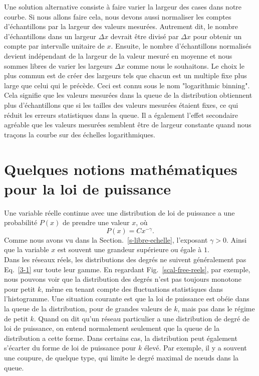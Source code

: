 Une solution alternative consiste à faire varier la largeur des cases dans notre courbe. Si nous allons faire cela, nous devons aussi normaliser les comptes d'échantillons par la largeur des valeurs mesurées. Autrement dit, le nombre d'échantillons dans un largeur $\Delta x$ devrait être divisé par $\Delta x$ pour obtenir un compte par intervalle unitaire de $x$. Ensuite, le nombre d'échantillons normalisés devient indépendant de la largeur de la valeur mesuré en moyenne et nous sommes libres de varier les largeurs $\Delta x$ comme nous le souhaitons. Le choix le plus commun est de créer des largeurs tels que chacun est un multiple fixe plus large que celui qui le précède. Ceci est connu sous le nom "logarithmic binning". Cela signifie que les valeurs mesurées dans la queue de la distribution obtiennent plus d'échantillons que si les tailles des valeurs mesurées étaient fixes, ce qui réduit les erreurs statistiques dans la queue. Il a également l'effet secondaire agréable que les valeurs mesurées semblent être de largeur constante quand nous traçons la courbe sur des échelles logarithmiques.
\section{Quelques notions mathématiques pour la loi de puissance}
Une variable réelle continue avec une distribution de loi de puissance a une probabilité $P(x)$ de prendre une valeur $x$, où
\begin{equation}
P(x)=Cx^{-\gamma}.
\label{3-1}
\end{equation}
Comme nous avons vu dans la Section.~\ref{s-libre-echelle}, l'exposant $\gamma>0$. Ainsi que la variable $x$ est souvent une grandeur supérieure ou égale à $1$.\\
Dans les réseaux réels, les distributions des degrés ne suivent généralement pas Eq.~\eqref{3-1} sur toute leur gamme.
En regardant Fig.~\ref{scal-free-reels}, par exemple, nous pouvons voir que la distribution des degrés n'est pas toujours monotone pour petit $k$, même en tenant compte des fluctuations statistiques dans l'histogramme. Une situation courante est que la loi de puissance est obéie dans la queue de la distribution, pour de grandes valeurs de $k$, mais pas dans le régime de petit $k$. Quand on dit qu'un réseau particulier a une distribution de degré de loi de puissance, on entend normalement seulement que la queue de la distribution a cette forme. Dans certains cas, la distribution peut également s'écarter du forme de loi de puissance pour $k$ élevé. Par exemple, il y a souvent une coupure, de quelque type, qui limite le degré maximal de nœuds dans la queue.
 
